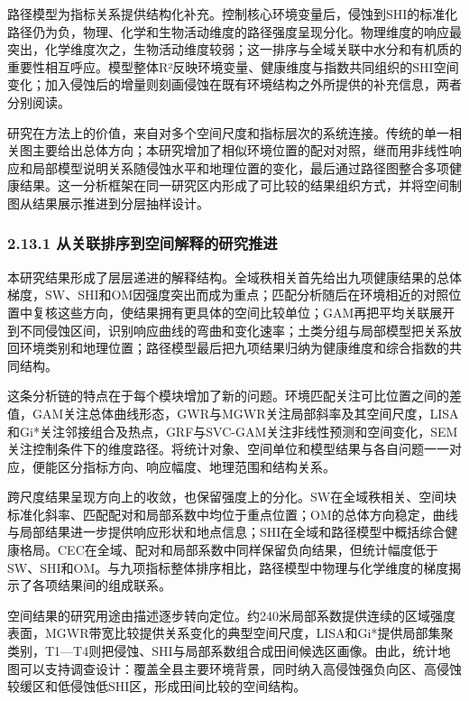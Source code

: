 \documentclass[
  11pt,
  a4paper,
]{ctexart}
\begin{document}
路径模型为指标关系提供结构化补充。控制核心环境变量后，侵蚀到SHI的标准化路径仍为负，物理、化学和生物活动维度的路径强度呈现分化。物理维度的响应最突出，化学维度次之，生物活动维度较弱；这一排序与全域关联中水分和有机质的重要性相互呼应。模型整体R²反映环境变量、健康维度与指数共同组织的SHI空间变化；加入侵蚀后的增量则刻画侵蚀在既有环境结构之外所提供的补充信息，两者分别阅读。

研究在方法上的价值，来自对多个空间尺度和指标层次的系统连接。传统的单一相关图主要给出总体方向；本研究增加了相似环境位置的配对对照，继而用非线性响应和局部模型说明关系随侵蚀水平和地理位置的变化，最后通过路径图整合多项健康结果。这一分析框架在同一研究区内形成了可比较的结果组织方式，并将空间制图从结果展示推进到分层抽样设计。

\hypertarget{ux4eceux5173ux8054ux6392ux5e8fux5230ux7a7aux95f4ux89e3ux91caux7684ux7814ux7a76ux63a8ux8fdb}{%
\subsubsection{2.13.1
从关联排序到空间解释的研究推进}\label{ux4eceux5173ux8054ux6392ux5e8fux5230ux7a7aux95f4ux89e3ux91caux7684ux7814ux7a76ux63a8ux8fdb}}

本研究结果形成了层层递进的解释结构。全域秩相关首先给出九项健康结果的总体梯度，SW、SHI和OM因强度突出而成为重点；匹配分析随后在环境相近的对照位置中复核这些方向，使结果拥有更具体的空间比较单位；GAM再把平均关联展开到不同侵蚀区间，识别响应曲线的弯曲和变化速率；土类分组与局部模型把关系放回环境类别和地理位置；路径模型最后把九项结果归纳为健康维度和综合指数的共同结构。

这条分析链的特点在于每个模块增加了新的问题。环境匹配关注可比位置之间的差值，GAM关注总体曲线形态，GWR与MGWR关注局部斜率及其空间尺度，LISA和Gi*关注邻接组合及热点，GRF与SVC-GAM关注非线性预测和空间变化，SEM关注控制条件下的维度路径。将统计对象、空间单位和模型结果与各自问题一一对应，便能区分指标方向、响应幅度、地理范围和结构关系。

跨尺度结果呈现方向上的收敛，也保留强度上的分化。SW在全域秩相关、空间块标准化斜率、匹配配对和局部系数中均位于重点位置；OM的总体方向稳定，曲线与局部结果进一步提供响应形状和地点信息；SHI在全域和路径模型中概括综合健康格局。CEC在全域、配对和局部系数中同样保留负向结果，但统计幅度低于SW、SHI和OM。与九项指标整体排序相比，路径模型中物理与化学维度的梯度揭示了各项结果间的组成联系。

空间结果的研究用途由描述逐步转向定位。约240米局部系数提供连续的区域强度表面，MGWR带宽比较提供关系变化的典型空间尺度，LISA和Gi*提供局部集聚类别，T1---T4则把侵蚀、SHI与局部系数组合成田间候选区画像。由此，统计地图可以支持调查设计：覆盖全县主要环境背景，同时纳入高侵蚀强负向区、高侵蚀较缓区和低侵蚀低SHI区，形成田间比较的空间结构。
\end{document}
